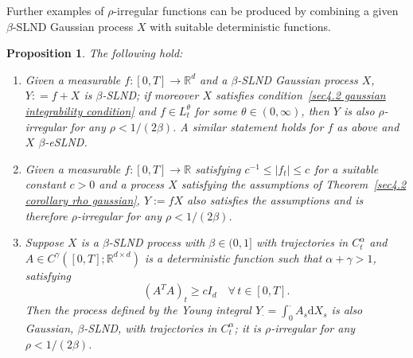 \documentclass[10pt]{article}
\newcommand{\assign}{:=}
\newcommand{\mathd}{\mathrm{d}}
\newenvironment{enumeratealpha}{\begin{enumerate}[a{\textup{)}}] }{\end{enumerate}}
\newtheorem{proposition}[theorem]{Proposition}
{\theorembodyfont{\rmfamily}\newtheorem{remark}[theorem]{Remark}}
\begin{document}
Further examples of $\rho$-irregular functions can be produced by combining a
given $\beta$\mbox{-}SLND Gaussian process $X$ with suitable deterministic
functions.

\begin{proposition}
  \label{sec4.2 prop deterministic perturbations}The following hold:
  \begin{enumeratealpha}
    \item Given a measurable $f : [0, T] \rightarrow \mathbb{R}^d$ and a
    $\beta$\mbox{-}SLND Gaussian process $X$, $Y : = f + X$ is
    $\beta$\mbox{-}SLND; if moreover $X$ satisfies condition~{\eqref{sec4.2
    gaussian integrability condition}} and $f \in L^{\theta}_t$ for some
    $\theta \in (0, \infty)$, then $Y$ is also $\rho$\mbox{-}irregular for any
    $\rho < 1 / (2 \beta)$. A similar statement holds for $f$ as above and $X$
    $\beta$-eSLND.
    
    \item Given a measurable $f : [0, T] \rightarrow \mathbb{R}$ satisfying
    $c^{- 1} \leqslant | f_t | \leqslant c^{}$ for a suitable constant $c > 0$
    and a process $X$ satisfying the assumptions of Theorem~\ref{sec4.2
    corollary rho gaussian}, $Y \assign f X$ also satisfies the assumptions
    and is therefore $\rho$\mbox{-}irregular for any $\rho < 1 / (2 \beta)$.
    
    \item Suppose $X$ is a $\beta$\mbox{-}SLND process with $\beta \in (0, 1]$
    with trajectories in $C^{\alpha}_t$ and $A \in C^{\gamma} ([0, T] ;
    \mathbb{R}^{d \times d})$ is a deterministic function such that $\alpha +
    \gamma > 1$, satisfying
    \[ (A^T A)_t \geqslant c I_d \quad \forall \, t \in [0, T] . \]
    Then the process defined by the Young integral $Y_{\cdot} = \int_0^{\cdot}
    A_s \mathd X_s$ is also Gaussian, $\beta$\mbox{-}SLND, with trajectories
    in $C^{\alpha}_t$; it is $\rho$\mbox{-}irregular for any $\rho < 1 / (2
    \beta)$.
  \end{enumeratealpha}
\end{proposition}
\end{document}
